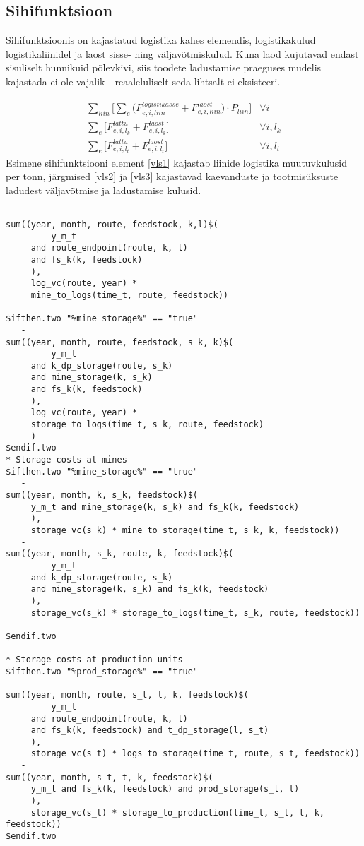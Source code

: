 \documentclass[10pt,a4paper]{article}
\begin{document}
\subsection{Sihifunktsioon}
Sihifunktsioonis on kajastatud logistika kahes elemendis, logistikakulud logistikaliinidel ja laost sisse- ning väljavõtmiskulud. Kuna laod kujutavad endast sisuliselt hunnikuid põlevkivi, siis toodete ladustamise praeguses mudelis kajastada ei ole vajalik - reaaleluliselt seda lihtsalt ei eksisteeri.

\begin{align}
\sum_{liin} \bigg[\sum_e \bigg( F^{logistikasse}_{e,i,liin} + F^{laost}_{e,i,liin} \bigg)\cdot P_{liin} \bigg] &\forall i \label{vls1} \\
\sum_{e} \bigg[ F^{lattu}_{e,i,l_k} + F^{laost}_{e,i,l_k} \bigg] &\forall i,l_k \label{vls2} \\
\sum_{e} \bigg[ F^{lattu}_{e,i,l_t} + F^{laost}_{e,i,l_t} \bigg] &\forall i,l_t \label{vls3} 
\end{align}
Esimene sihifunktsiooni element \eqref{vls1} kajastab liinide logistika muutuvkulusid per tonn, järgmised \eqref{vls2} ja \eqref{vls3} kajastavad kaevanduste ja tootmisüksuste ladudest väljavõtmise ja ladustamise kulusid.

\begin{verbatim}
-
sum((year, month, route, feedstock, k,l)$(
         y_m_t
     and route_endpoint(route, k, l)
     and fs_k(k, feedstock)
     ),
     log_vc(route, year) *
     mine_to_logs(time_t, route, feedstock))

$ifthen.two "%mine_storage%" == "true"
   -
sum((year, month, route, feedstock, s_k, k)$(
         y_m_t
     and k_dp_storage(route, s_k)
     and mine_storage(k, s_k)
     and fs_k(k, feedstock)
     ),
     log_vc(route, year) *
     storage_to_logs(time_t, s_k, route, feedstock)
     )
$endif.two
* Storage costs at mines
$ifthen.two "%mine_storage%" == "true"
   -
sum((year, month, k, s_k, feedstock)$(
     y_m_t and mine_storage(k, s_k) and fs_k(k, feedstock)
     ),
     storage_vc(s_k) * mine_to_storage(time_t, s_k, k, feedstock))
   -
sum((year, month, s_k, route, k, feedstock)$(
         y_m_t
     and k_dp_storage(route, s_k)
     and mine_storage(k, s_k) and fs_k(k, feedstock)
     ),
     storage_vc(s_k) * storage_to_logs(time_t, s_k, route, feedstock))

$endif.two

* Storage costs at production units
$ifthen.two "%prod_storage%" == "true"
-
sum((year, month, route, s_t, l, k, feedstock)$(
         y_m_t
     and route_endpoint(route, k, l)
     and fs_k(k, feedstock) and t_dp_storage(l, s_t)
     ),
     storage_vc(s_t) * logs_to_storage(time_t, route, s_t, feedstock))
   -
sum((year, month, s_t, t, k, feedstock)$(
     y_m_t and fs_k(k, feedstock) and prod_storage(s_t, t)
     ),
     storage_vc(s_t) * storage_to_production(time_t, s_t, t, k, feedstock))
$endif.two
\end{verbatim}
\end{document}
